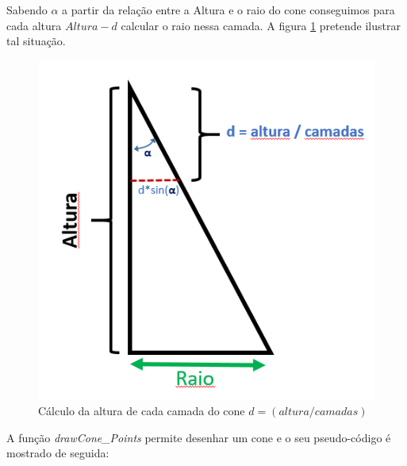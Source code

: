Sabendo $\alpha$ a partir da relação entre a Altura e o raio do cone conseguimos para cada altura $Altura -d$ calcular o raio nessa camada. A figura \ref{p1:fig:p3_conePerfil} pretende ilustrar tal situação. 

\begin{figure}[<+htpb+>]
	\centering
	\includegraphics[scale=0.5]{imagens/p3_conePerfil.png}
	\caption{Cálculo da altura de cada camada do cone $d = (altura/camadas)$}
	\label{p1:fig:p3_conePerfil}
\end{figure}

A função \textit{drawCone\_Points} permite desenhar um cone e o seu pseudo-código é mostrado de seguida: 


